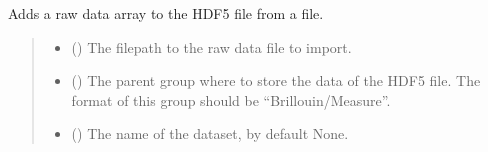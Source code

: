 \documentclass[letterpaper,10pt,english]{sphinxmanual}
\begin{document}
\begin{fulllineitems}
\begin{fulllineitems}
\begin{quote}
\begin{description}
\begin{itemize}
\end{itemize}

\end{description}\end{quote}

\end{fulllineitems}


\begin{fulllineitems}
\label{\detokenize{source/HDF5_BLS:HDF5_BLS.wrapper.Wrapper.import_raw_data}}
\pysigstartsignatures
\pysiglinewithargsret
{}
{\sphinxparamcomma {}\sphinxparamcomma {}\sphinxparamcomma {}\sphinxparamcomma {}\sphinxparamcomma {}\sphinxparamcomma {}}
{}
\pysigstopsignatures
\sphinxAtStartPar
Adds a raw data array to the HDF5 file from a file.
\begin{quote}\begin{description}
\begin{itemize}
\item {} 
\sphinxAtStartPar
{} () \textendash{} The filepath to the raw data file to import.

\item {} 
\sphinxAtStartPar
{} (\sphinxstyleliteralemphasis{\sphinxupquote{, }}) \textendash{} The parent group where to store the data of the HDF5 file. The format of this group should be “Brillouin/Measure”.

\item {} 
\sphinxAtStartPar
{} (\sphinxstyleliteralemphasis{\sphinxupquote{, }}) \textendash{} The name of the dataset, by default None.


\end{itemize}
\end{description}
\end{quote}
\end{fulllineitems}
\end{fulllineitems}
\end{document}
